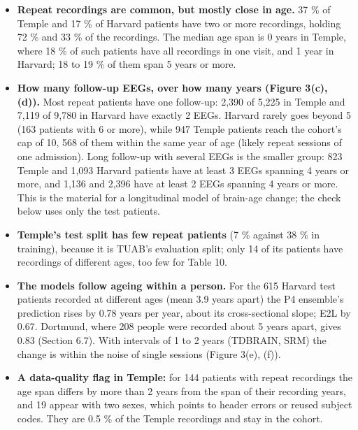 \documentclass[11pt,a4paper]{article}
\begin{document}
\begin{itemize}
\item \textbf{Repeat recordings are common, but mostly close in age.} 37 \% of Temple and 17 \% of Harvard patients have two or more recordings, holding 72 \% and 33 \% of the recordings. The median age span is 0 years in Temple, where 18 \% of such patients have all recordings in one visit, and 1 year in Harvard; 18 to 19 \% of them span 5 years or more.
\item \textbf{How many follow-up EEGs, over how many years (Figure 3(c), (d)).} Most repeat patients have one follow-up: 2,390 of 5,225 in Temple and 7,119 of 9,780 in Harvard have exactly 2 EEGs. Harvard rarely goes beyond 5 (163 patients with 6 or more), while 947 Temple patients reach the cohort's cap of 10, 568 of them within the same year of age (likely repeat sessions of one admission). Long follow-up with several EEGs is the smaller group: 823 Temple and 1,093 Harvard patients have at least 3 EEGs spanning 4 years or more, and 1,136 and 2,396 have at least 2 EEGs spanning 4 years or more. This is the material for a longitudinal model of brain-age change; the check below uses only the test patients.
\item \textbf{Temple's test split has few repeat patients} (7 \% against 38 \% in training), because it is TUAB's evaluation split; only 14 of its patients have recordings of different ages, too few for Table 10.
\item \textbf{The models follow ageing within a person.} For the 615 Harvard test patients recorded at different ages (mean 3.9 years apart) the P4 ensemble's prediction rises by 0.78 years per year, about its cross-sectional slope; E2L by 0.67. Dortmund, where 208 people were recorded about 5 years apart, gives 0.83 (Section 6.7). With intervals of 1 to 2 years (TDBRAIN, SRM) the change is within the noise of single sessions (Figure 3(e), (f)).
\item \textbf{A data-quality flag in Temple:} for 144 patients with repeat recordings the age span differs by more than 2 years from the span of their recording years, and 19 appear with two sexes, which points to header errors or reused subject codes. They are 0.5 \% of the Temple recordings and stay in the cohort.
\end{itemize}
\end{document}
